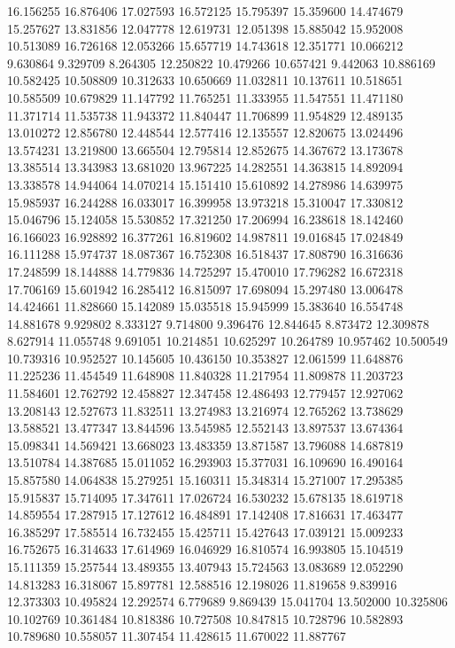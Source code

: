 16.156255
16.876406
17.027593
16.572125
15.795397
15.359600
14.474679
15.257627
13.831856
12.047778
12.619731
12.051398
15.885042
15.952008
10.513089
16.726168
12.053266
15.657719
14.743618
12.351771
10.066212
9.630864
9.329709
8.264305
12.250822
10.479266
10.657421
9.442063
10.886169
10.582425
10.508809
10.312633
10.650669
11.032811
10.137611
10.518651
10.585509
10.679829
11.147792
11.765251
11.333955
11.547551
11.471180
11.371714
11.535738
11.943372
11.840447
11.706899
11.954829
12.489135
13.010272
12.856780
12.448544
12.577416
12.135557
12.820675
13.024496
13.574231
13.219800
13.665504
12.795814
12.852675
14.367672
13.173678
13.385514
13.343983
13.681020
13.967225
14.282551
14.363815
14.892094
13.338578
14.944064
14.070214
15.151410
15.610892
14.278986
14.639975
15.985937
16.244288
16.033017
16.399958
13.973218
15.310047
17.330812
15.046796
15.124058
15.530852
17.321250
17.206994
16.238618
18.142460
16.166023
16.928892
16.377261
16.819602
14.987811
19.016845
17.024849
16.111288
15.974737
18.087367
16.752308
16.518437
17.808790
16.316636
17.248599
18.144888
14.779836
14.725297
15.470010
17.796282
16.672318
17.706169
15.601942
16.285412
16.815097
17.698094
15.297480
13.006478
14.424661
11.828660
15.142089
15.035518
15.945999
15.383640
16.554748
14.881678
9.929802
8.333127
9.714800
9.396476
12.844645
8.873472
12.309878
8.627914
11.055748
9.691051
10.214851
10.625297
10.264789
10.957462
10.500549
10.739316
10.952527
10.145605
10.436150
10.353827
12.061599
11.648876
11.225236
11.454549
11.648908
11.840328
11.217954
11.809878
11.203723
11.584601
12.762792
12.458827
12.347458
12.486493
12.779457
12.927062
13.208143
12.527673
11.832511
13.274983
13.216974
12.765262
13.738629
13.588521
13.477347
13.844596
13.545985
12.552143
13.897537
13.674364
15.098341
14.569421
13.668023
13.483359
13.871587
13.796088
14.687819
13.510784
14.387685
15.011052
16.293903
15.377031
16.109690
16.490164
15.857580
14.064838
15.279251
15.160311
15.348314
15.271007
17.295385
15.915837
15.714095
17.347611
17.026724
16.530232
15.678135
18.619718
14.859554
17.287915
17.127612
16.484891
17.142408
17.816631
17.463477
16.385297
17.585514
16.732455
15.425711
15.427643
17.039121
15.009233
16.752675
16.314633
17.614969
16.046929
16.810574
16.993805
15.104519
15.111359
15.257544
13.489355
13.407943
15.724563
13.083689
12.052290
14.813283
16.318067
15.897781
12.588516
12.198026
11.819658
9.839916
12.373303
10.495824
12.292574
6.779689
9.869439
15.041704
13.502000
10.325806
10.102769
10.361484
10.818386
10.727508
10.847815
10.728796
10.582893
10.789680
10.558057
11.307454
11.428615
11.670022
11.887767
